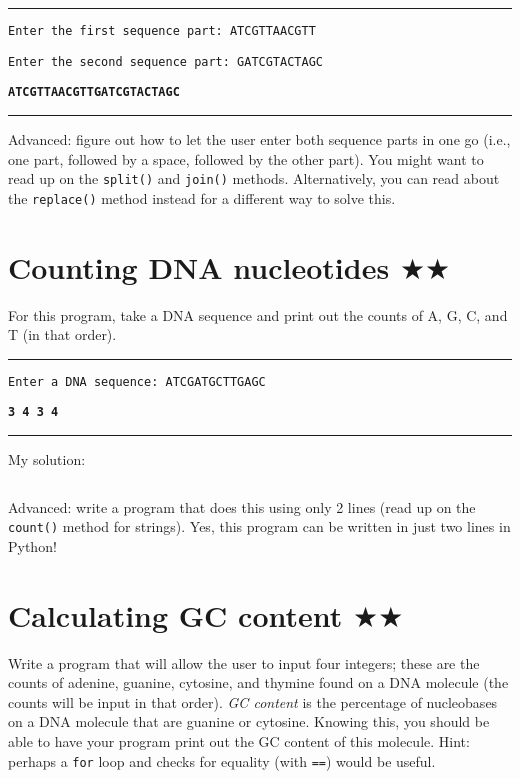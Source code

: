 \documentclass[12pt, letterpaper]{article}
\begin{document}
\vspace{2mm}\hrule\vspace{2mm}

\texttt{Enter the first sequence part: ATCGTTAACGTT}

\texttt{Enter the second sequence part: GATCGTACTAGC}

\texttt{\bfseries ATCGTTAACGTTGATCGTACTAGC}

\vspace{2mm}\hrule\vspace{2mm}

Advanced: figure out how to let the user enter both sequence parts in one go (i.e., one part, followed by a space, followed by the other part). You might want to read up on the \texttt{split()} and \texttt{join()} methods. Alternatively, you can read about the \texttt{replace()} method instead for a different way to solve this.

\section{\upshape Counting DNA nucleotides $\bigstar\bigstar$}
For this program, take a DNA sequence and print out the counts of A, G, C, and T (in that order).

\vspace{2mm}\hrule\vspace{2mm}

\texttt{Enter a DNA sequence: ATCGATGCTTGAGC}

\texttt{\bfseries 3 4 3 4}

\vspace{2mm}\hrule\vspace{2mm}

My solution:

\inputminted[bgcolor=bg,linenos,obeytabs=true,samepage=true,tabsize=4]{python}{src01/counting_dna_nucleotides.py}

Advanced: write a program that does this using only 2 lines (read up on the \texttt{count()} method for strings). Yes, this program can be written in just two lines in Python!

\section{\upshape Calculating GC content $\bigstar\bigstar$}
Write a program that will allow the user to input four integers; these are the counts of adenine, guanine, cytosine, and thymine found on a DNA molecule (the counts will be input in that order). \emph{GC content} is the percentage of nucleobases on a DNA molecule that are guanine or cytosine. Knowing this, you should be able to have your program print out the GC content of this molecule. Hint: perhaps a \texttt{for} loop and checks for equality (with \texttt{==}) would be useful.
\end{document}
